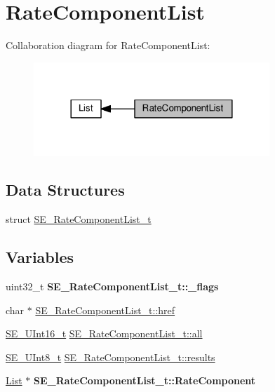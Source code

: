 \hypertarget{group__RateComponentList}{}\section{Rate\+Component\+List}
\label{group__RateComponentList}
Collaboration diagram for Rate\+Component\+List\+:\nopagebreak
\begin{figure}[H]
\begin{center}
\leavevmode
\includegraphics[width=252pt]{group__RateComponentList}
\end{center}
\end{figure}
\subsection*{Data Structures}
\begin{DoxyCompactItemize}
\item 
struct \hyperlink{structSE__RateComponentList__t}{S\+E\+\_\+\+Rate\+Component\+List\+\_\+t}
\end{DoxyCompactItemize}
\subsection*{Variables}
\begin{DoxyCompactItemize}
\item 
\mbox{\label{group__RateComponentList_ga67fba9dab7827d526020422ef50b52a3}} 
uint32\+\_\+t {\bfseries S\+E\+\_\+\+Rate\+Component\+List\+\_\+t\+::\+\_\+flags}
\item 
char $\ast$ \hyperlink{group__RateComponentList_gaa83df8a31bf912815dbe0a1a6d413325}{S\+E\+\_\+\+Rate\+Component\+List\+\_\+t\+::href}
\item 
\hyperlink{group__UInt16_gac68d541f189538bfd30cfaa712d20d29}{S\+E\+\_\+\+U\+Int16\+\_\+t} \hyperlink{group__RateComponentList_ga66c86683c6d297588ba72f872df21ac8}{S\+E\+\_\+\+Rate\+Component\+List\+\_\+t\+::all}
\item 
\hyperlink{group__UInt8_gaf7c365a1acfe204e3a67c16ed44572f5}{S\+E\+\_\+\+U\+Int8\+\_\+t} \hyperlink{group__RateComponentList_ga8ca19d62c82aab6c64c1237662b916dc}{S\+E\+\_\+\+Rate\+Component\+List\+\_\+t\+::results}
\item 
\mbox{\label{group__RateComponentList_ga1d5ccef7f70c124f863ba2794cb3cfea}} 
\hyperlink{structList}{List} $\ast$ {\bfseries S\+E\+\_\+\+Rate\+Component\+List\+\_\+t\+::\+Rate\+Component}
\end{DoxyCompactItemize}


